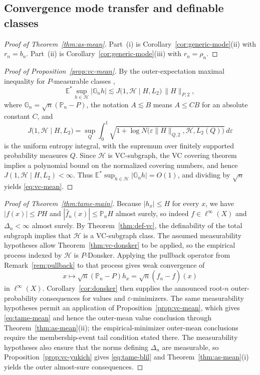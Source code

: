 \documentclass[11pt]{article}
\begin{document}
\subsection{Convergence mode transfer and definable classes}
\begin{proof}[Proof of Theorem~\ref{thm:as-mean}]
Part~(i) is Corollary~\ref{cor:generic-mode}(ii) with $r_{n}=b_{n}$.
Part~(ii) is Corollary~\ref{cor:generic-mode}(iii) with $r_{n}=\rho_{n}$. 
\end{proof}
%
\begin{proof}[Proof of Proposition~\ref{prop:vc-mean}]
By the outer-expectation maximal inequality for $P$-measurable
classes \citep[Theorem~2.14.1]{vdVW2023},
\[
\mathbb{E}^{*}\sup_{h\in\mathcal{H}}\lvert\mathbb{G}_{n}h\rvert\lesssim J\bigl(1,\mathcal{H}\mid H,L_{2}\bigr)\,\lVert H\rVert_{P,2},
\]
where $\mathbb{G}_{n}=\sqrt{n}(\mathbb{P}_{n}-P)$, the notation $A\lesssim B$
means $A\le CB$ for an absolute constant $C$, and 
\[
J\bigl(1,\mathcal{H}\mid H,L_{2}\bigr)=\sup_{Q}\int_{0}^{1}\sqrt{1+\log N\bigl(\varepsilon\lVert H\rVert_{Q,2},\mathcal{H},L_{2}(Q)\bigr)}\,d\varepsilon
\]
is the uniform entropy integral, with the supremum over finitely supported
probability measures $Q$. Since $\mathcal{H}$ is VC-subgraph, the
VC covering theorem \citep[Theorem~2.6.7]{vdVW2023} implies a polynomial
bound on the normalized covering numbers, and hence $J(1,\mathcal{H}\mid H,L_{2})<\infty$.
Thus $\mathbb{E}^{*}\sup_{h\in\mathcal{H}}\lvert\mathbb{G}_{n}h\rvert=O(1)$,
and dividing by $\sqrt{n}$ yields \eqref{eq:vc-mean}. 
\end{proof}
%
\begin{proof}[Proof of Theorem~\ref{thm:tame-main}]
Because $|h_{x}|\le H$ for every $x$, we have $|f(x)|\le PH$ and
$|\hat{f}_{n}(x)|\le\mathbb{P}_{n}H$ almost surely, so indeed $f\in\ell^{\infty}(X)$
and $\Delta_{n}<\infty$ almost surely. By Theorem~\ref{thm:def-vc},
the definability of the total subgraph implies that $\mathcal{H}$
is a VC-subgraph class. The assumed measurability hypotheses allow
Theorem~\ref{thm:vc-donsker} to be applied, so the empirical process
indexed by $\mathcal{H}$ is $P$-Donsker. Applying the pullback operator
from Remark~\ref{rem:pullback} to that process gives weak convergence of 
\[
x\longmapsto\sqrt{n}(\mathbb{P}_{n}-P)h_{x}=\sqrt{n}(\hat{f}_{n}-f)(x)
\]
in $\ell^{\infty}(X)$. Corollary~\ref{cor:donsker} then supplies
the announced root-$n$ outer-probability consequences for values
and $\varepsilon$-minimizers. The same measurability hypotheses permit
an application of Proposition~\ref{prop:vc-mean}, which gives \eqref{eq:tame-mean}
and hence the outer-mean value conclusion through Theorem~\ref{thm:as-mean}(ii);
the empirical-minimizer outer-mean conclusions require the membership-event
tail condition stated there. The measurability hypotheses also ensure that
the norms defining $\Delta_{n}$ are measurable, so Proposition~\ref{prop:vc-yukich}
gives \eqref{eq:tame-blil} and Theorem~\ref{thm:as-mean}(i) yields the
outer almost-sure consequences.
\end{proof}
\end{document}
